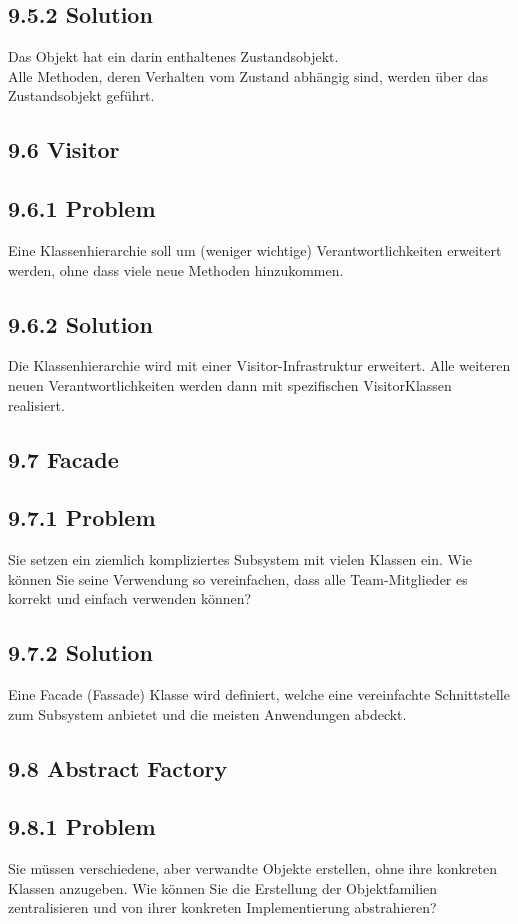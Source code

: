 \documentclass[10pt]{article}
\begin{document}
\subsection*{9.5.2 Solution}
Das Objekt hat ein darin enthaltenes Zustandsobjekt.\\
Alle Methoden, deren Verhalten vom Zustand abhängig sind, werden über das Zustandsobjekt geführt.

\subsection*{9.6 Visitor}
\subsection*{9.6.1 Problem}
Eine Klassenhierarchie soll um (weniger wichtige) Verantwortlichkeiten erweitert werden, ohne dass viele neue Methoden hinzukommen.

\subsection*{9.6.2 Solution}
Die Klassenhierarchie wird mit einer Visitor-Infrastruktur erweitert. Alle weiteren neuen Verantwortlichkeiten werden dann mit spezifischen VisitorKlassen realisiert.

\subsection*{9.7 Facade}
\subsection*{9.7.1 Problem}
Sie setzen ein ziemlich kompliziertes Subsystem mit vielen Klassen ein. Wie können Sie seine Verwendung so vereinfachen, dass alle Team-Mitglieder es korrekt und einfach verwenden können?

\subsection*{9.7.2 Solution}
Eine Facade (Fassade) Klasse wird definiert, welche eine vereinfachte Schnittstelle zum Subsystem anbietet und die meisten Anwendungen abdeckt.

\subsection*{9.8 Abstract Factory}
\subsection*{9.8.1 Problem}
Sie müssen verschiedene, aber verwandte Objekte erstellen, ohne ihre konkreten Klassen anzugeben. Wie können Sie die Erstellung der Objektfamilien zentralisieren und von ihrer konkreten Implementierung abstrahieren?
\end{document}

